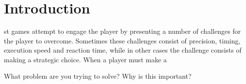 \section{Introduction}
\label{01}
st games attempt to engage the player by presenting a number of challenges for the player to overcome. Sometimes these challenges consist of precision, timing, execution speed and reaction time, while in other cases the challenge consists of making a strategic choice. When a player must make a 


What problem are you trying to solve? Why is this important?\cite{FearAI}
